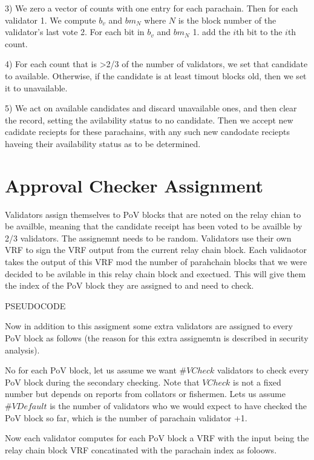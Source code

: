 3) We zero a vector of counts with one entry for each parachain. Then for each validator
    1. We compute 
    $b_v$ and $bm_N$ 
    where $N$ is the block number of the validator's last vote
    2. For each bit in $b_v$ and $bm_N$
        1. add the $i$th bit to the $i$th count.
        
4) For each count that is >2/3 of the number of validators, we set that candidate to available. Otherwise, if the candidate is at least timout blocks old, then we set it to unavailable.

5) We act on available candidates and discard unavailable ones, and then clear the record, setting the avilability status to no candidate. Then we accept new cadidate reciepts for these parachains, with any such new candodate reciepts haveing their availability status as to be determined.

\section{Approval Checker Assignment}
\label{sect-shot-assignment}

Validators assign themselves to PoV blocks that are noted on the relay chian to be availble, meaning that the candidate receipt has been voted to be availble by 2/3 validators. 
The assignemnt needs to be random. Validators use their own VRF to sign the VRF output from the current relay chain block. Each validaotor takes the output of this VRF mod the number of parahchain blocks that we were decided to be avilable in this relay chain block and exectued. This will give them the index of the PoV block they are assigned to and need to check. 

PSEUDOCODE

Now in addition to this assigment some extra validators are assigned to every PoV block as follows (the reason for this extra assignemtn is described in security analysis).

No for each PoV block, let us assume we want $\#VCheck$ validators to check every PoV block during the secondary checking. Note that $VCheck$ is not a fixed number but depends on reports from collators or fishermen. Lets us assume $\#VDefault$ is the number  of validators who we would expect to have checked the PoV block so far, which is the number of parachain validator +1.  

Now each validator computes for each PoV block a VRF with the input being the relay chain block VRF concatinated with the parachain index as foloows. 

